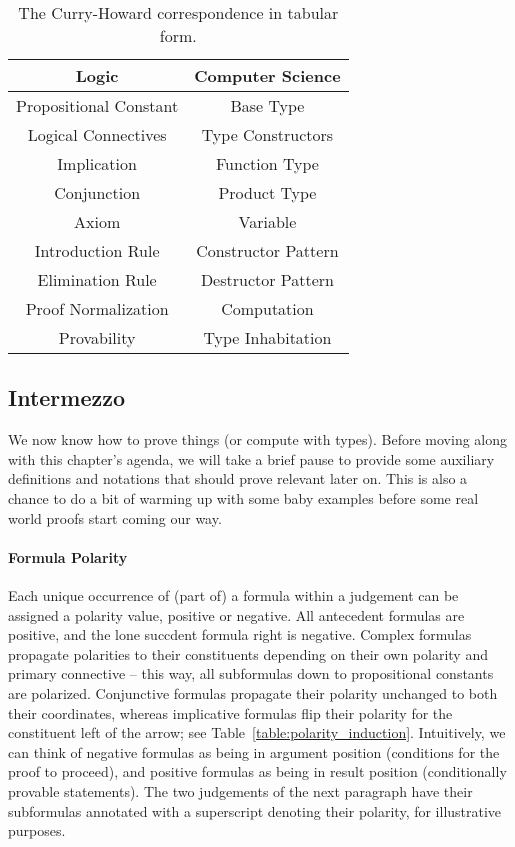 \begin{table}
	\centering
	\begin{tabularx}{0.8\textwidth}{@{}CC@{}}
	\textbf{Logic}			& \textbf{Computer Science}\\
	\toprule
	Propositional Constant	& Base Type\\
	Logical Connectives 	& Type Constructors\\
	Implication				& Function Type\\
	Conjunction				& Product Type\\
	Axiom					& Variable\\
	Introduction Rule		& Constructor Pattern\\
	Elimination Rule		& Destructor Pattern\\
	Proof Normalization		& Computation\\
	Provability				& Type Inhabitation	 
	\end{tabularx}
	\caption{The Curry-Howard correspondence in tabular form.}
	\label{table:CHC}
\end{table}

\subsection{Intermezzo}
\label{subsection:utility_definitions}
We now know how to prove things (or compute with types). 
Before moving along with this chapter's agenda, we will take a brief pause to provide some auxiliary definitions and notations that should prove relevant later on.
This is also a chance to do a bit of warming up with some baby examples before some real world proofs start coming our way.


\paragraph{Formula Polarity}
Each unique occurrence of (part of) a formula within a judgement can be assigned a polarity value, positive or negative.
All antecedent formulas are positive, and the lone succdent formula right is negative.
Complex formulas propagate polarities to their constituents depending on their own polarity and primary connective -- this way, all subformulas down to propositional constants are polarized.
Conjunctive formulas propagate their polarity unchanged to both their coordinates, whereas implicative formulas flip their polarity for the constituent left of the arrow; see Table~\ref{table:polarity_induction}.
Intuitively, we can think of negative formulas as being in argument position (conditions for the proof to proceed), and positive formulas as being in result position (conditionally provable statements).
The two judgements of the next paragraph have their subformulas annotated with a superscript denoting their polarity, for illustrative purposes.


